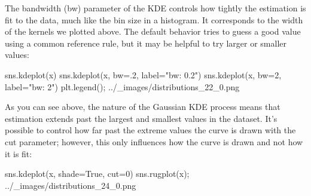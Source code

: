 \begin{frame}
The bandwidth (bw) parameter of the KDE controls how tightly the estimation is fit to the data, much like the bin size in a histogram. It corresponds to the width of the kernels we plotted above. The default behavior tries to guess a good value using a common reference rule, but it may be helpful to try larger or smaller values:

sns.kdeplot(x)
sns.kdeplot(x, bw=.2, label="bw: 0.2")
sns.kdeplot(x, bw=2, label="bw: 2")
plt.legend();
../_images/distributions_22_0.png
\end{frame}
\begin{frame}
As you can see above, the nature of the Gaussian KDE process means that estimation extends past the largest and smallest values in the dataset. It’s possible to control how far past the extreme values the curve is drawn with the cut parameter; however, this only influences how the curve is drawn and not how it is fit:

sns.kdeplot(x, shade=True, cut=0)
sns.rugplot(x);
../_images/distributions_24_0.png

\end{frame}
